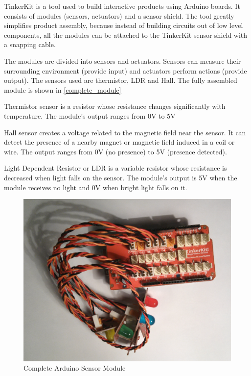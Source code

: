 TinkerKit \cite{tinkerkit_introduction} is a tool used to build interactive products using Arduino boards. It consists of modules (sensors, actuators) and a sensor shield. The tool greatly simplifies product assembly, because instead of building circuits out of low level components, all the modules can be attached to the TinkerKit sensor shield with a snapping cable.

The modules are divided into sensors and actuators. Sensors can measure their surrounding environment (provide input) and actuators perform actions (provide output). The sensors used are thermistor, LDR and Hall. The fully assembled module is shown in \autoref{complete_module}

Thermistor sensor \cite{thermistor_sensor} is a resistor whose resistance changes significantly with temperature. The module's output ranges from 0V to 5V

Hall sensor \cite{hall_sensor} creates a voltage related to the magnetic field near the sensor. It can detect the presence of a nearby magnet or magnetic field induced in a coil or wire. The output ranges from 0V (no presence) to 5V (presence detected). 

Light Dependent Resistor or LDR \cite{light_sensor} is a variable resistor whose resistance is decreased when light falls on the sensor. The module's output is 5V when the module receives no light and 0V when bright light falls on it.
\begin{figure}[h!]
\centering
\includegraphics[scale=0.58]{2/figures/complete_module.pdf}
\caption{Complete Arduino Sensor Module}
\label{complete_module}
\end{figure}	


